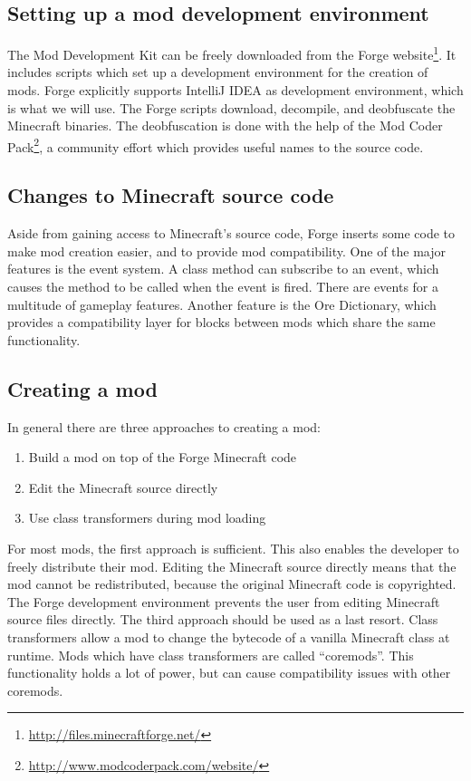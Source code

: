 \documentclass[]{article}
\begin{document}
\subsection{Setting up a mod development environment}
The Mod Development Kit can be freely downloaded from the Forge website\footnote{\url{http://files.minecraftforge.net/}}.
It includes scripts which set up a development environment for the creation of mods.
Forge explicitly supports IntelliJ IDEA as development environment, which is what we will use.
The Forge scripts download, decompile, and deobfuscate the Minecraft binaries.
The deobfuscation is done with the help of the Mod Coder Pack\footnote{\url{http://www.modcoderpack.com/website/}}, a community effort which provides useful names to the source code.



\subsection{Changes to Minecraft source code}
Aside from gaining access to Minecraft's source code, Forge inserts some code to make mod creation easier, and to provide mod compatibility.
One of the major features is the event system.
A class method can subscribe to an event, which causes the method to be called when the event is fired.
There are events for a multitude of gameplay features.
Another feature is the Ore Dictionary, which provides a compatibility layer for blocks between mods which share the same functionality.

\subsection{Creating a mod}
In general there are three approaches to creating a mod:
\begin{enumerate}
  \item Build a mod on top of the Forge Minecraft code
  \item Edit the Minecraft source directly
  \item Use class transformers during mod loading
\end{enumerate}
For most mods, the first approach is sufficient.
This also enables the developer to freely distribute their mod.
Editing the Minecraft source directly means that the mod cannot be redistributed, because the original Minecraft code is copyrighted.
The Forge development environment prevents the user from editing Minecraft source files directly.
The third approach should be used as a last resort.
Class transformers allow a mod to change the bytecode of a vanilla Minecraft class at runtime.
Mods which have class transformers are called \enquote{coremods}.
This functionality holds a lot of power, but can cause compatibility issues with other coremods.
\end{document}
